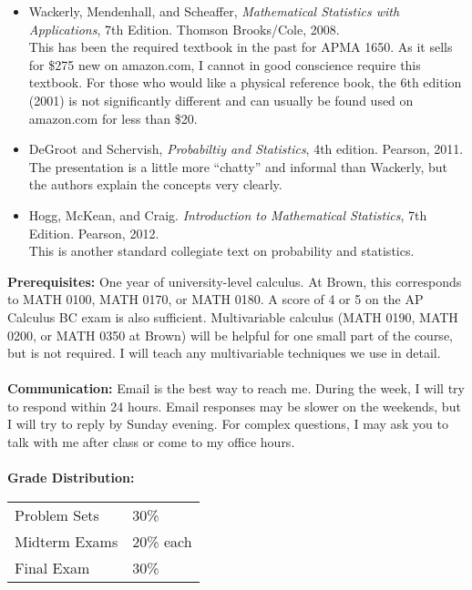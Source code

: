 \documentclass[11pt]{article}
\begin{document}
\begin{itemize}
\item Wackerly, Mendenhall, and Scheaffer, \emph{Mathematical Statistics with Applications}, 7th Edition. Thomson Brooks/Cole, 2008. \\

This has been the required textbook in the past for APMA 1650. As it sells for \$275 new on amazon.com, I cannot in good conscience require this textbook. For those who would like a physical reference book, the 6th edition (2001) is not significantly different and can usually be found used on amazon.com for less than \$20.
\item DeGroot and Schervish, \emph{Probabiltiy and Statistics}, 4th edition. Pearson, 2011.\\
The presentation is a little more ``chatty'' and informal than Wackerly, but the authors explain the concepts very clearly.
\item Hogg, McKean, and Craig. \emph{Introduction to Mathematical Statistics}, 7th Edition. Pearson, 2012. \\
This is another standard collegiate text on probability and statistics.
\end{itemize}
\textbf {Prerequisites:} One year of university-level calculus. At Brown, this corresponds to MATH 0100, MATH 0170, or MATH 0180. A score of 4 or 5 on the AP Calculus BC exam is also sufficient. Multivariable calculus (MATH 0190, MATH 0200, or MATH 0350 at Brown) will be helpful for one small part of the course, but is not required. I will teach any multivariable techniques we use in detail.\\\\
\textbf{Communication: }Email is the best way to reach me. During the week, I will try to respond within 24 hours. Email responses may be slower on the weekends, but I will try to reply by Sunday evening. For complex questions, I may ask you to talk with me after class or come to my office hours.
 \\\\
\textbf {Grade Distribution:} \\
\hspace*{40mm}
\begin{tabular}{ l l }
Problem Sets & 30\% \\
Midterm Exams  & 20\% each \\
Final Exam  & 30\%
\end{tabular} \\\\
\end{document}
